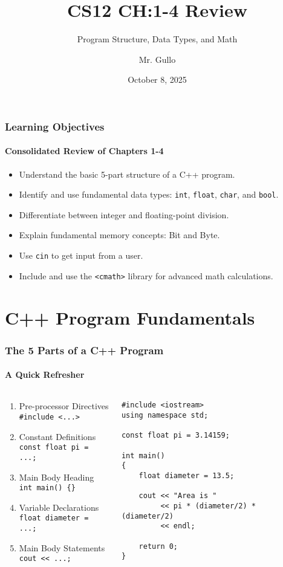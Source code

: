 \documentclass{beamer}
\title[Short Title]{CS12 CH:1-4 Review}
\subtitle{Program Structure, Data Types, and Math}
\author[Mr. Gullo]{Mr. Gullo}
\date[Oct 8, 2025]{October 8, 2025}
\begin{document}
\frame{\titlepage}

\begin{frame}
\frametitle{Learning Objectives}
\framesubtitle{Consolidated Review of Chapters 1-4}
\begin{itemize}
    \item Understand the basic 5-part structure of a C++ program.\pause
    \item Identify and use fundamental data types: \texttt{int}, \texttt{float}, \texttt{char}, and \texttt{bool}.\pause
    \item Differentiate between integer and floating-point division.\pause
    \item Explain fundamental memory concepts: Bit and Byte.\pause
    \item Use \texttt{cin} to get input from a user.\pause
    \item Include and use the \texttt{<cmath>} library for advanced math calculations.
\end{itemize}
\end{frame}

\section{C++ Program Fundamentals}

\begin{frame}[fragile]
\frametitle{The 5 Parts of a C++ Program}
\framesubtitle{A Quick Refresher}
\begin{columns}[T]
\begin{column}{0.5\textwidth}
    \begin{enumerate}
        \item \alert{Pre-processor Directives} \\ \texttt{\#include <...>}\pause
        \item \alert{Constant Definitions} \\ \texttt{const float pi = ...;}\pause
        \item \alert{Main Body Heading} \\ \texttt{int main() \{\}}\pause
        \item \alert{Variable Declarations} \\ \texttt{float diameter = ...;}\pause
        \item \alert{Main Body Statements} \\ \texttt{cout << ...;}
    \end{enumerate}
\end{column}\pause
\begin{column}{0.5\textwidth}
\begin{verbatim}
#include <iostream>
using namespace std;

const float pi = 3.14159;

int main()
{
    float diameter = 13.5;

    cout << "Area is "
         << pi * (diameter/2) * (diameter/2)
         << endl;

    return 0;
}
\end{verbatim}
\end{column}
\end{columns}
\end{frame}
\end{document}
